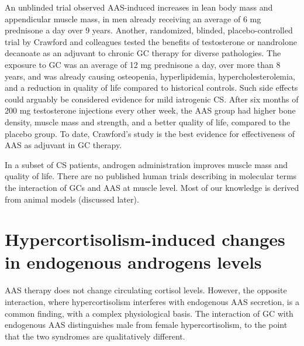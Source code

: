\documentclass[12pt,english]{report}\usepackage[]{graphicx}\usepackage[]{color}
\begin{document}
An unblinded trial observed AAS-induced increases in lean body mass
and appendicular muscle mass, in men already receiving an average
of 6 mg prednisone a day over 9 years\citep{ragnarsson2013effect}.
Another, randomized, blinded, placebo-controlled trial by Crawford
and colleagues tested the benefits of testosterone or nandrolone decanoate
as an adjuvant to chronic GC therapy for diverse pathologies\citep{crawford2003randomized}.
The exposure to GC was an average of 12 mg prednisone a day, over
more than 8 years, and was already causing osteopenia, hyperlipidemia,
hypercholesterolemia, and a reduction in quality of life compared
to historical controls\citep{vanschoor2006development}. Such side
effects could arguably be considered evidence for mild iatrogenic
CS. After six months of 200 mg testosterone injections every other
week, the AAS group had higher bone density, muscle mass and strength,
and a better quality of life, compared to the placebo group. To date,
Crawford's study is the best evidence for effectiveness of AAS as
adjuvant in GC therapy.

In a subset of CS patients, androgen administration improves muscle
mass and quality of life. There are no published human trials describing
in molecular terms the interaction of GCs and AAS at muscle level.
Most of our knowledge is derived from animal models (discussed later).


\section{Hypercortisolism-induced changes in endogenous androgens levels}

AAS therapy does not change circulating cortisol levels\citep{baume2006effect}.
However, the opposite interaction, where hypercortisolism interferes
with endogenous AAS secretion, is a common finding, with a complex
physiological basis. The interaction of GC with endogenous AAS distinguishes
male from female hypercortisolism, to the point that the two syndromes
are qualitatively different.
\end{document}
